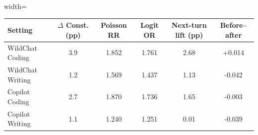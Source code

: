 
\centering
\begin{adjustbox}{width=\textwidth}
\begin{tabular}{lccccc}
\toprule
Setting & $\Delta$ Const. (pp) & Poisson RR & Logit OR & Next-turn lift (pp) & Before--after \\
\midrule
WildChat Coding  & 3.9 & 1.852 & 1.761 & 2.68 & +0.014 \\
WildChat Writing & 1.2 & 1.569 & 1.437 & 1.13 & -0.042 \\
Copilot Coding   & 2.7 & 1.870 & 1.736 & 1.65 & -0.003 \\
Copilot Writing  & 1.1 & 1.240 & 1.251 & 0.01 & -0.039 \\
\bottomrule
\end{tabular}
\end{adjustbox}

